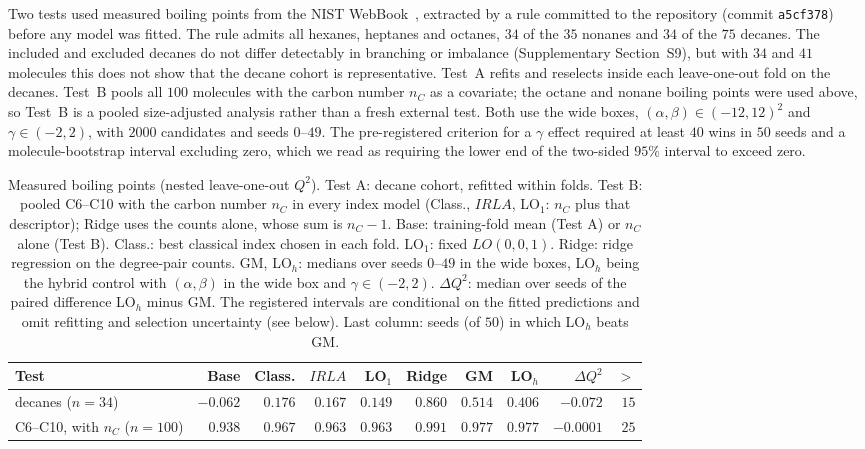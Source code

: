 Two tests used measured boiling points from the NIST
WebBook~\cite{NISTWebBook}, extracted by a rule committed to the
repository (commit \texttt{a5cf378}) before any model was fitted. The rule
admits all hexanes, heptanes and octanes, $34$ of the $35$ nonanes and
$34$ of the $75$ decanes. The included and excluded decanes do not differ
detectably in branching or imbalance (Supplementary Section~S9), but with
$34$ and $41$ molecules this does not show that the decane cohort is
representative. Test~A refits and reselects inside each leave-one-out fold
on the decanes. Test~B pools all $100$ molecules with the carbon number
$n_C$ as a covariate; the octane and nonane boiling points were used
above, so Test~B is a pooled size-adjusted analysis rather than a fresh
external test. Both use the wide boxes, $(\alpha,\beta) \in (-12,12)^2$ and
$\gamma \in (-2,2)$, with $2000$ candidates and seeds $0$--$49$. The
pre-registered criterion for a $\gamma$ effect required at least $40$ wins
in $50$ seeds and a molecule-bootstrap interval excluding zero, which we
read as requiring the lower end of the two-sided $95\%$ interval to exceed
zero.

\begin{table}[htbp]
\centering
\caption{Measured boiling points (nested leave-one-out $Q^2$). Test A:
decane cohort, refitted within folds. Test B: pooled C6--C10 with the carbon number
$n_C$ in every index model (Class., $IRLA$,
LO$_1$: $n_C$ plus that descriptor); Ridge uses the counts alone, whose sum is $n_C - 1$. Base: training-fold mean (Test A)
or $n_C$ alone (Test B).
Class.: best classical index chosen in each fold. LO$_1$: fixed
$LO(0,0,1)$. Ridge: ridge regression on the degree-pair counts. GM,
LO$_h$: medians over seeds $0$--$49$ in the wide boxes, LO$_h$
being the hybrid control with $(\alpha,\beta)$ in the wide box and
$\gamma \in (-2,2)$.
$\Delta Q^2$: median over seeds of the paired difference LO$_h$ minus GM. The registered intervals are conditional on the fitted predictions and omit refitting and selection uncertainty (see below). Last column: seeds (of $50$) in
which LO$_h$ beats GM.}
\label{tab:bp}
\scriptsize
\setlength{\tabcolsep}{1.5pt}
\begin{tabular}{lrrrrrrrrr}
\toprule
Test & Base & Class. & $IRLA$ & LO$_1$ & Ridge & GM & LO$_h$ & $\Delta Q^2$ & $>$\\
\midrule
decanes ($n = 34$) & $-0.062$ & $0.176$ & $0.167$ & $0.149$ & $0.860$ & $0.514$ & $0.406$ & $-0.072$ & $15$\\
C6--C10, with $n_C$ ($n = 100$) & $0.938$ & $0.967$ & $0.963$ & $0.963$ & $0.991$ & $0.977$ & $0.977$ & $-0.0001$ & $25$\\
\bottomrule
\end{tabular}
\end{table}

